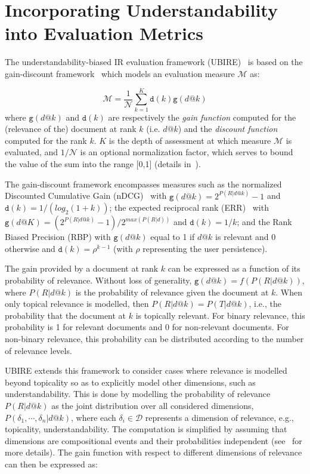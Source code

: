 \section{Incorporating Understandability into Evaluation Metrics}
\label{sec:understandability_metrics}
The understandability-biased IR evaluation framework (UBIRE)~\cite{zuccon14,zuccon16} is based on the gain-discount framework~\cite{carterette11} which models an evaluation measure $\mathcal{M}$ as:

\vspace{-4pt}
\begin{equation*}
\mathcal{M} = \frac{1}{\mathcal{N}} \sum_{k=1}^{K} \mathtt{d}(k) \mathtt{g}(d@k)
\end{equation*}
%
where $\mathtt{g}(d@k)$ and $\mathtt{d}(k)$ are respectively the \textit{gain function} computed for the (relevance of the) document at rank $k$ (i.e. $d@k$) and the \textit{discount function} computed for the rank $k$.
$K$ is the depth of assessment at which measure $\mathcal{M}$ is evaluated, and $1/\mathcal{N}$ is an optional normalization factor, which serves to bound the value of the sum into the range [0,1] (details in~\cite{carterette11}).

The gain-discount framework encompasses measures such as the normalized Discounted Cumulative Gain (nDCG)~\cite{jarvelin02} with $\mathtt{g}(d@k) = 2^{P(R|d@k)} - 1$ and $\mathtt{d}(k) = 1/(log_2(1 + k))$; the expected reciprocal rank (ERR)~\cite{chapelle09} with $\mathtt{g}(d@K) =  (2^{P (R|d@k)} - 1)/2^{max(P (R|d))}$ and $\mathtt{d}(k) = 1/k$; and the Rank Biased Precision (RBP) with $\mathtt{g}(d@k)$ equal to 1 if $d@k$ is relevant and 0 otherwise and $\mathtt{d}(k) = \rho^{k-1}$ (with $\rho$ representing the user persistence).

The gain provided by a document at rank $k$ can be expressed as a function of its probability of relevance. Without loss of generality, $\mathtt{g}(d@k) = f(P(R|d@k))$, where $P(R|d@k)$ is the probability of relevance given the document at $k$. 
When only topical relevance is modelled, then $P(R|d@k) = P(T|d@k)$, i.e., the probability that the document at $k$ is topically relevant. 
For binary relevance, this probability is 1 for relevant documents and 0 for non-relevant documents. For non-binary relevance, this probability can be distributed according to the number of relevance levels.

UBIRE extends this framework to consider cases where relevance is modelled beyond topicality so as to explicitly model other dimensions, such as understandability.
This is done by modelling the probability of relevance $P(R|d@k)$ as the joint distribution over all considered dimensions, $P(\delta_1, \cdots, \delta_n|d@k)$, where each $\delta_i \in \mathcal{D}$ represents a dimension of relevance, e.g., topicality, understandability. The computation is simplified by assuming that dimensions are compositional events and their probabilities independent (see~\cite{zuccon16} for more details). The gain function with respect to different dimensions of relevance can then be expressed as:

